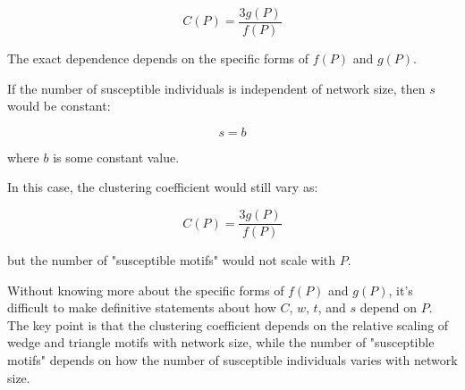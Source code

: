 \documentclass{article}
\begin{document}
\begin{equation*}
C(P) = \frac{3g(P)}{f(P)}
\end{equation*}

The exact dependence depends on the specific forms of $f(P)$ and $g(P)$.

If the number of susceptible individuals is independent of network size, then $s$ would be constant:

\begin{equation*}
s = b
\end{equation*}

where $b$ is some constant value.

In this case, the clustering coefficient would still vary as:

\begin{equation*}
C(P) = \frac{3g(P)}{f(P)}
\end{equation*}

but the number of "susceptible motifs" would not scale with $P$.

Without knowing more about the specific forms of $f(P)$ and $g(P)$, it's difficult to make definitive statements about how $C$, $w$, $t$, and $s$ depend on $P$. The key point is that the clustering coefficient depends on the relative scaling of wedge and triangle motifs with network size, while the number of "susceptible motifs" depends on how the number of susceptible individuals varies with network size.
\end{document}
